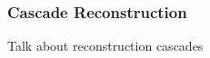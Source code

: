 \subsubsection{Cascade Reconstruction}
\label{CascadeReconstruction}

Talk about reconstruction cascades